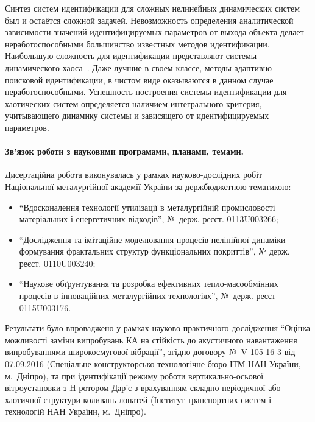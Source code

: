 Синтез систем идентификации для сложных нелинейных динамических систем
был и остаётся сложной задачей. Невозможность определения
аналитической зависимости значений идентифицируемых параметров
от выхода объекта делает неработоспособными большинство известных
методов идентификации. Наибольшую сложность для идентификации
представляют системы динамического хаоса~\cite{moon_chaotic_vibr,anisch_nonlin_eff,sprott_212}.
Даже лучшие в своем классе, методы адаптивно-поисковой идентификации, %
в чистом виде оказываются в данном случае неработоспособными.
Успешность построения системы идентификации для хаотических
систем определяется наличием интегрального критерия,
учитывающего динамику системы и зависящего от идентифицируемых параметров.

\paragraph{Зв'язок роботи з науковими програмами, планами, темами.}

Дисертаційна робота виконувалась у рамках науково-дослідних робіт
Національної металургійної академії України за держбюджетною
тематикою:

\begin{itemize}


\item
  ``Вдосконалення технології утилізації в металургійній промисловості
  матеріальних і енергетичних відходів'', №~держ. реєст. 0113U003266;

  \item
  ``Дослідження та імітаційне моделювання процесів нелінійної динаміки
  формування фрактальних структур функціональних   покриттів'',
  № держ. реєст. 0110U003240;

  \item
  ``Наукове обґрунтування та розробка ефективних тепло-масообмінних
  процесів в інноваційних металургійних технологіях'', №~держ. реєст 0115U003176.

\end{itemize}

Результати було впроваджено у рамках науково-практичного дослідження
``Оцінка можливості заміни випробувань КА на стійкість до акустичного навантаження
випробуваннями широкосмугової вібрації'', згідно договору \hbox{№~V-105-16-3} від 07.09.2016
(Спеціальне конструкторсько-технологічне бюро ІТМ НАН України, м.~Дніпро),
та при ідентифікації режиму роботи вертикально-осьової вітроустановки з H-ротором Дар'є
з врахуванням складно-періодичної або хаотичної структури коливань лопатей
(Інститут транспортних систем і технологій НАН України, м.~Дніпро).


